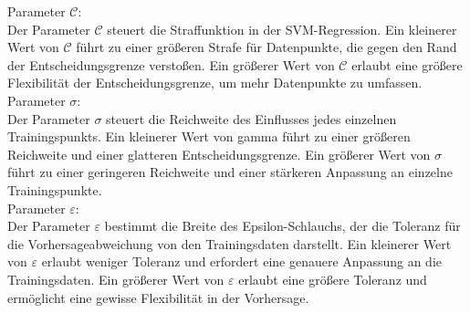 \documentclass[a4paper,12pt]{article}
\begin{document}


Parameter $\mathcal{C}$:\\

Der Parameter $\mathcal{C}$ steuert die Straffunktion in der SVM-Regression. 
Ein kleinerer Wert von $\mathcal{C}$ führt zu einer größeren Strafe für Datenpunkte, 
die gegen den Rand der Entscheidungsgrenze verstoßen. Ein größerer Wert von $\mathcal{C}$ erlaubt eine 
größere Flexibilität der Entscheidungsgrenze, um mehr Datenpunkte zu umfassen. \\




Parameter $\sigma$:\\

Der Parameter $\sigma$ steuert die Reichweite des Einflusses jedes 
einzelnen Trainingspunkts. Ein kleinerer Wert von gamma führt zu einer größeren Reichweite 
und einer glatteren Entscheidungsgrenze. Ein größerer Wert von $\sigma$ führt zu einer 
geringeren Reichweite und einer stärkeren Anpassung an einzelne Trainingspunkte. \\



Parameter $\varepsilon$:\\

Der Parameter $\varepsilon$ bestimmt die Breite des Epsilon-Schlauchs, 
der die Toleranz für die Vorhersageabweichung von den Trainingsdaten darstellt. 
Ein kleinerer Wert von $\varepsilon$ erlaubt weniger Toleranz und erfordert eine 
genauere Anpassung an die Trainingsdaten. 
Ein größerer Wert von $\varepsilon$ erlaubt eine größere Toleranz und ermöglicht eine 
gewisse Flexibilität in der Vorhersage.
\end{document}

